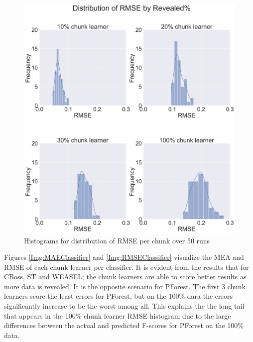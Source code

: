   \begin{figure}[hbt!]
    \captionsetup{justification=raggedright}
    \centering
    \includegraphics[width=\textwidth]{hist_rmse.jpg}
    \centering
    \caption{Histograms for distribution of RMSE per chunk over 50 runs}
    \label{Img:HistogramRMSE}
  \end{figure}

Figures \ref{Img:MAEClassifier} and \ref{Img:RMSEClassifier} visualize the MEA and RMSE of each chunk learner per classifier.
It is evident from the results that for CBoss, ST and WEASEL; the chunk learners are able to score better results as more data is revealed.
It is the opposite scenario for PForest. The first 3 chunk learners score the least errors for PForest, but on the 100\% dara the errors significantly increase to be the worst among all.
This explains the the long tail that appears in the 100\% chunk learner RMSE histogram due to the large differences between the actual and predicted F-scores for PForest on the 100\% data.

